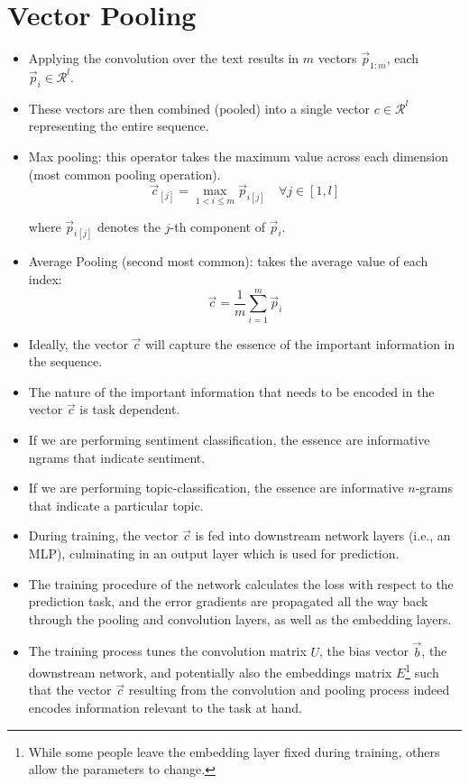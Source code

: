 \section{Vector Pooling}
\begin{itemize}
\item Applying the convolution over the text results in $m$ vectors $\vec{p}_{1:m}$, each $\vec{p}_i \in \mathcal{R}^l$.
\item These vectors are then combined (pooled) into a single vector $c \in \mathcal{R}^l$ representing the entire sequence.
\item Max pooling: this operator takes the maximum value across each dimension (most common pooling operation).
\begin{displaymath}
\vec{c}_{[j]}= \max_{1< i \leq m} \vec{p}_{i[j]} \quad \forall j \in [1,l]
\end{displaymath}

where $\vec{p}_{i[j]}$ denotes the $j$-th component of $\vec{p}_{i}$. 

\item Average Pooling (second most common): takes the average value of each index:
\begin{displaymath}
\vec{c} = \frac{1}{m} \sum_{i=1}^{m}\vec{p}_i
\end{displaymath}


\item Ideally, the vector $\vec{c}$ will capture the essence of the important information in the sequence. 

\item The nature of the important information that needs to be encoded in the vector $\vec{c}$ is task dependent. 
\item If we are performing sentiment classification, the essence are informative ngrams that indicate
sentiment.
\item If we are performing topic-classification, the essence are informative $n$-grams that indicate a particular topic.

\item During training, the vector $\vec{c}$ is fed into downstream network layers (i.e., an MLP), culminating in an output layer which is used for prediction.
\item The training procedure of the network calculates the loss with respect to the prediction task, and the error gradients are propagated all the way back through the pooling and convolution layers, as well as the embedding layers. 
\item The training process tunes the convolution matrix $U$, the bias vector $\vec{b}$, the downstream network, and
potentially also the embeddings matrix $E$\footnote{While some people leave the embedding layer fixed during training, others allow the parameters to change.}  such that the vector $\vec{c}$ resulting from the convolution
and pooling process indeed encodes information relevant to the task at hand.
\end{itemize}



